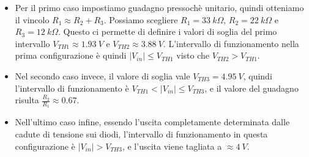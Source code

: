 \begin{itemize}
    \item Per il primo caso impostiamo guadagno pressochè unitario, quindi otteniamo il vincolo
          $R_1\approx R_2+R_3$. Possiamo scegliere $R_1=33\ k\Omega$, $R_2=22\ k\Omega$ e $R_3=12\ k\Omega$.
          Questo ci permette di definire i valori di soglia del primo intervallo $V_{TH1}\approx1.93\ V$
          e $V_{TH2}\approx3.88\ V$. L'intervallo di funzionamento nella prima configurazione è quindi
          $|V_{in}|\leq V_{TH1}$ visto che $V_{TH2}>V_{TH1}$.

    \item Nel secondo caso invece, il valore di soglia vale $V_{TH3}=4.95\ V$, quindi l'intervallo di
          funzionamento è $V_{TH1}<|V_{in}|\leq V_{TH3}$, e il valore del guadagno risulta
          $\frac{R_2}{R_1}\approx0.67$.

    \item Nell'ultimo caso infine, essendo l'uscita completamente determinata dalle cadute di tensione
          sui diodi, l'intervallo di funzionamento in questa configurazione è $|V_{in}|>V_{TH3}$, e
          l'uscita viene tagliata a $\approx4\ V$.

\end{itemize}

\begin{figure}[H]
    \centering
\end{figure}

